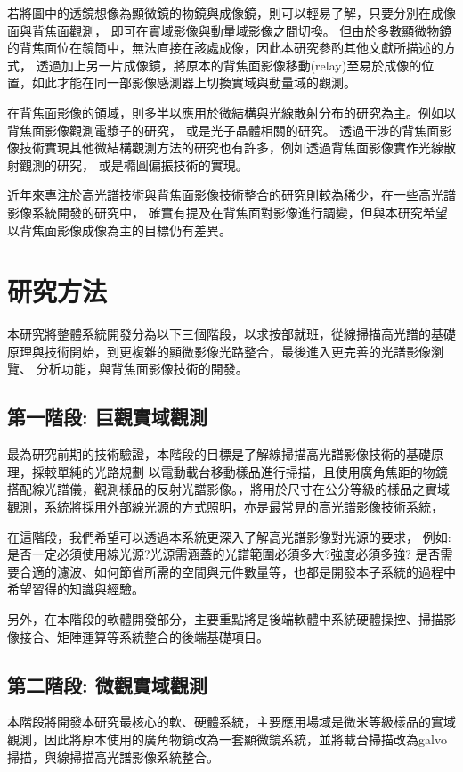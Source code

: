\documentclass[12pt]{article}
\begin{document}
若將圖中的透鏡想像為顯微鏡的物鏡與成像鏡，則可以輕易了解，只要分別在成像面與背焦面觀測，
即可在實域影像與動量域影像之間切換。
但由於多數顯微物鏡的背焦面位在鏡筒中，無法直接在該處成像，因此本研究參酌其他文獻\cite{bfpimage}所描述的方式，
透過加上另一片成像鏡，將原本的背焦面影像移動(relay)至易於成像的位置，如此才能在同一部影像感測器上切換實域與動量域的觀測。

在背焦面影像的領域，則多半以應用於微結構與光線散射分布的研究為主。例如以背焦面影像觀測電漿子的研究，
或是光子晶體相關的研究\cite{hartmann2013radiation,zhang2014back,wagner2012back}。
透過干涉的背焦面影像技術實現其他微結構觀測方法的研究也有許多，例如透過背焦面影像實作光線散射觀測的研究\cite{davidson2006interferometric}，
或是橢圓偏振技術的實現\cite{feke1998interferometric}。

近年來專注於高光譜技術與背焦面影像技術整合的研究則較為稀少，在一些高光譜影像系統開發的研究中，
確實有提及在背焦面對影像進行調變\cite{gao2010snapshot}，但與本研究希望以背焦面影像成像為主的目標仍有差異。
\section{研究方法}
本研究將整體系統開發分為以下三個階段，以求按部就班，從線掃描高光譜的基礎原理與技術開始，到更複雜的顯微影像光路整合，最後進入更完善的光譜影像瀏覽、
分析功能，與背焦面影像技術的開發。
\subsection{第一階段: 巨觀實域觀測} \label{macroreal}
最為研究前期的技術驗證，本階段的目標是了解線掃描高光譜影像技術的基礎原理，採較單純的光路規劃
以電動載台移動樣品進行掃描，且使用廣角焦距的物鏡搭配線光譜儀，觀測樣品的反射光譜影像。，將用於尺寸在公分等級的樣品之實域觀測，系統將採用外部線光源的方式照明，亦是最常見的高光譜影像技術系統，

在這階段，我們希望可以透過本系統更深入了解高光譜影像對光源的要求，
例如: 是否一定必須使用線光源?光源需涵蓋的光譜範圍必須多大?強度必須多強?
是否需要合適的濾波、如何節省所需的空間與元件數量等，也都是開發本子系統的過程中希望習得的知識與經驗。

另外，在本階段的軟體開發部分，主要重點將是後端軟體中系統硬體操控、掃描影像接合、矩陣運算等系統整合的後端基礎項目。
\subsection{第二階段: 微觀實域觀測} \label{microreal}
本階段將開發本研究最核心的軟、硬體系統，主要應用場域是微米等級樣品的實域觀測，因此將原本使用的廣角物鏡改為一套顯微鏡系統，並將載台掃描改為galvo掃描，與線掃描高光譜影像系統整合。
\end{document}
